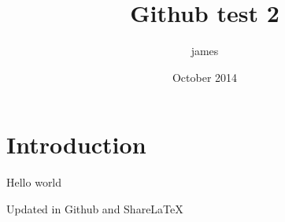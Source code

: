 \documentclass{article}
\title{Github test 2}
\author{james }
\date{October 2014}
\begin{document}
\maketitle

\section{Introduction}

Hello world

Updated in Github and ShareLaTeX
\end{document}
